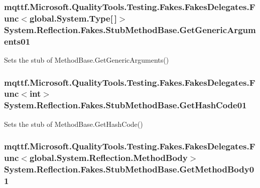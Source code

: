 \hypertarget{class_system_1_1_reflection_1_1_fakes_1_1_stub_method_base_a936fd9ec42c642ff201bb389276145c6}{
\subsubsection[{Get\-Generic\-Arguments01}]{\setlength{\rightskip}{0pt plus 5cm}mqttf.\-Microsoft.\-Quality\-Tools.\-Testing.\-Fakes.\-Fakes\-Delegates.\-Func$<$global.\-System.\-Type\mbox{[}$\,$\mbox{]}$>$ System.\-Reflection.\-Fakes.\-Stub\-Method\-Base.\-Get\-Generic\-Arguments01}}\label{class_system_1_1_reflection_1_1_fakes_1_1_stub_method_base_a936fd9ec42c642ff201bb389276145c6}


Sets the stub of Method\-Base.\-Get\-Generic\-Arguments()

\hypertarget{class_system_1_1_reflection_1_1_fakes_1_1_stub_method_base_a19f244ada57d208a2fef39ebb66ec6ab}{
\subsubsection[{Get\-Hash\-Code01}]{\setlength{\rightskip}{0pt plus 5cm}mqttf.\-Microsoft.\-Quality\-Tools.\-Testing.\-Fakes.\-Fakes\-Delegates.\-Func$<$int$>$ System.\-Reflection.\-Fakes.\-Stub\-Method\-Base.\-Get\-Hash\-Code01}}\label{class_system_1_1_reflection_1_1_fakes_1_1_stub_method_base_a19f244ada57d208a2fef39ebb66ec6ab}


Sets the stub of Method\-Base.\-Get\-Hash\-Code()

\hypertarget{class_system_1_1_reflection_1_1_fakes_1_1_stub_method_base_aa656cd88a3dcf46e0dc0cdbb3816202d}{
\subsubsection[{Get\-Method\-Body01}]{\setlength{\rightskip}{0pt plus 5cm}mqttf.\-Microsoft.\-Quality\-Tools.\-Testing.\-Fakes.\-Fakes\-Delegates.\-Func$<$global.\-System.\-Reflection.\-Method\-Body$>$ System.\-Reflection.\-Fakes.\-Stub\-Method\-Base.\-Get\-Method\-Body01}}\label{class_system_1_1_reflection_1_1_fakes_1_1_stub_method_base_aa656cd88a3dcf46e0dc0cdbb3816202d}



